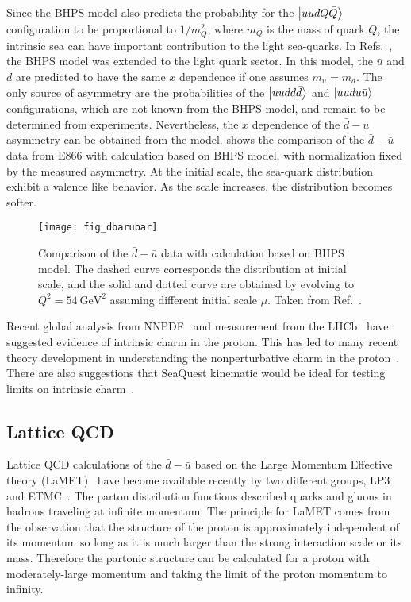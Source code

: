 \documentclass[../main.tex]{subfiles}
\begin{document}
Since the BHPS model also predicts the probability for the $\ket{uudQ\bar{Q}}$ configuration to
be proportional to $1/m^2_Q$, where $m_Q$ is the mass of quark $Q$, the intrinsic sea can have important
contribution to the light sea-quarks. In Refs.~\cite{chang2011,chang2011a}, the BHPS model
was extended to the light quark sector. In this model, the $\bar{u}$ and $\bar{d}$ are predicted
to  have the same $x$ dependence if one assumes $m_u=m_d$. The only source of asymmetry
are the probabilities of the $\ket{uudd\bar{d}}$ and $\ket{uudu\bar{u}}$ configurations,
which are not known from the BHPS model, and remain to be determined from experiments.
Nevertheless, the $x$ dependence of the $\bar{d}-\bar{u}$ asymmetry can be obtained from the model.
 shows the comparison of the $\bar{d}-\bar{u}$ data from E866 with calculation
based on BHPS model, with normalization fixed by the measured asymmetry. At the initial scale,
the sea-quark distribution exhibit a valence like behavior. As the scale increases, the distribution
becomes softer.
\begin{figure}[hb!]
	\centering
	\texttt{[image: fig\_dbarubar]}
	\caption{Comparison of the $\bar{d}-\bar{u}$ data with calculation based on BHPS model.
		The dashed curve corresponds the distribution at initial scale, and the solid and dotted
		curve are obtained by evolving to $Q^2=\SI{54}{\GeV\squared}$ assuming different initial scale $\mu$.
		Taken from Ref.~\cite{chang2011}. }
	\label{fig:five_quark}
\end{figure}

Recent global analysis from NNPDF~\cite{ball2022} and measurement from the LHCb~\cite{aaij2022}
have suggested evidence of intrinsic charm in the proton. This has led to many recent theory
development in understanding the nonperturbative charm in the proton~\cite{guzzi2023}. There are
also suggestions that SeaQuest kinematic would be ideal for testing limits on intrinsic charm~\cite{vogt2021}.

\subsection{Lattice QCD}
\label{subsec:lattice}
Lattice QCD calculations of the $\bar{d} - \bar{u}$ based on the Large Momentum Effective
theory (LaMET)~\cite{ji2021,constantinou2021} have become available recently by two different groups,
LP3~\cite{chen2018} and ETMC~\cite{alexandrou2018}.
The parton distribution functions described quarks and gluons in hadrons traveling at infinite
momentum. The principle for LaMET comes from the observation that the structure of the proton is
approximately independent of its momentum so long as it is much larger than the strong interaction
scale or its mass. Therefore the partonic structure can be calculated for a proton with
moderately-large momentum and taking the limit of the proton momentum to infinity.
\end{document}

